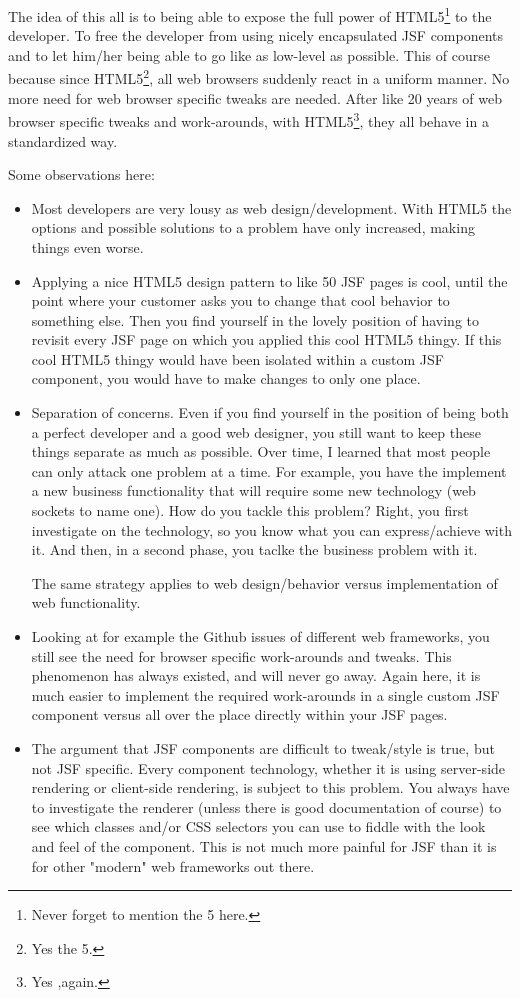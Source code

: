 The idea of this all is to being able to expose the full power of HTML5\footnote{Never forget to mention the 5 here.} to the developer.
To free the developer from using nicely encapsulated JSF components and to let him/her being able to go like as low-level as possible.
This of course because since HTML5\footnote{Yes the 5.}, all web browsers suddenly react in a uniform manner.
No more need for web browser specific tweaks are needed.
After like 20 years of web browser specific tweaks and work-arounds, with HTML5\footnote{Yes ,again.}, they all behave in a standardized way.

Some observations here:
\begin{itemize}
	\item Most developers are very lousy as web design/development. With HTML5 the options and possible solutions to a problem have only increased, making things even worse.
	\item Applying a nice HTML5 design pattern to like 50 JSF pages is cool, until the point where your customer asks you to change that cool behavior to something else. Then you find yourself in the lovely position of having to revisit every JSF page on which you applied this cool HTML5 thingy.
	If this cool HTML5 thingy would have been isolated within a custom JSF component, you would have to make changes to only one place.
	\item Separation of concerns. Even if you find yourself in the position of being both a perfect developer and a good web designer, you still want to keep these things separate as much as possible.
	Over time, I learned that most people can only attack one problem at a time.
	For example, you have the implement a new business functionality that will require some new technology (web sockets to name one).
	How do you tackle this problem? Right, you first investigate on the technology, so you know what you can express/achieve with it.
	And then, in a second phase, you taclke the business problem with it.
	
	The same strategy applies to web design/behavior versus implementation of web functionality.
	
	\item Looking at for example the Github issues of different web frameworks,
	you still see the need for browser specific work-arounds and tweaks.
	This phenomenon has always existed, and will never go away.
	Again here, it is much easier to implement the required work-arounds in a single custom JSF component versus all over the place directly within your JSF pages.
	
	\item The argument that JSF components are difficult to tweak/style is true, but not JSF specific.
	Every component technology, whether it is using server-side rendering or client-side rendering,
	is subject to this problem.
	You always have to investigate the renderer (unless there is good documentation of course)
	to see which classes and/or CSS selectors you can use to fiddle with the look and feel of the component.
	This is not much more painful for JSF than it is for other "modern" web frameworks out there.
\end{itemize}

